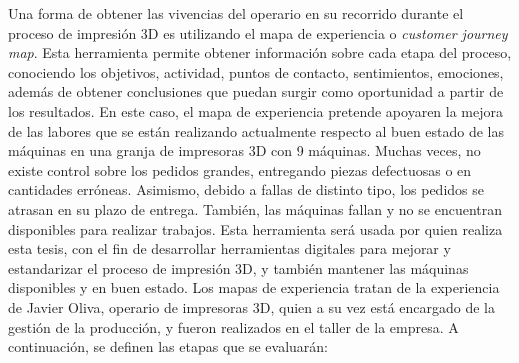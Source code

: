 Una forma de obtener las vivencias del operario en su recorrido durante el proceso de impresión 3D es utilizando el mapa de experiencia o \textit{customer journey map}. Esta herramienta permite obtener información sobre cada etapa del proceso, conociendo los objetivos, actividad, puntos de contacto, sentimientos, emociones, además de obtener conclusiones que puedan surgir como oportunidad a partir de los resultados. En este caso, el mapa de experiencia pretende apoyaren la mejora de las labores que se están realizando actualmente respecto al buen estado de las máquinas en una granja de impresoras 3D con 9 máquinas. Muchas veces, no existe control sobre los pedidos grandes, entregando piezas defectuosas o en cantidades erróneas. Asimismo, debido a fallas de distinto tipo, los pedidos se atrasan en su plazo de entrega. También, las máquinas fallan y no se encuentran disponibles para realizar trabajos. Esta herramienta será usada por quien realiza esta tesis, con el fin de desarrollar herramientas digitales para mejorar y estandarizar el proceso de impresión 3D, y también mantener las máquinas disponibles y en buen estado. Los mapas de experiencia tratan de la experiencia de Javier Oliva, operario de impresoras 3D, quien a su vez está encargado de la gestión de la producción, y fueron realizados en el taller de la empresa. A continuación, se definen las etapas que se evaluarán:

